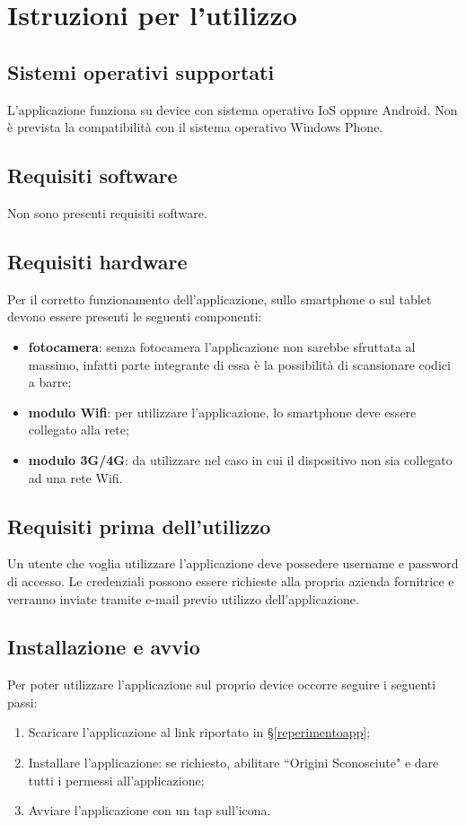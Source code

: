 \section{Istruzioni per l'utilizzo}

\subsection{Sistemi operativi supportati}

L'applicazione funziona su device con sistema operativo IoS oppure Android. Non è prevista la compatibilità con il sistema operativo Windows Phone.

\subsection{Requisiti software}

Non sono presenti requisiti software.

\subsection{Requisiti hardware}

Per il corretto funzionamento dell'applicazione, sullo smartphone o sul tablet devono essere presenti le seguenti componenti:
\begin{itemize}
	\item \textbf{fotocamera}: senza fotocamera l'applicazione non sarebbe sfruttata al massimo, infatti parte integrante di essa è la
	possibilità di scansionare codici a barre;
	\item \textbf{modulo Wifi}: per utilizzare l'applicazione, lo smartphone deve essere collegato alla rete;
	\item \textbf{modulo 3G/4G}: da utilizzare nel caso in cui il dispositivo non sia collegato ad una rete Wifi.
\end{itemize}

\subsection{Requisiti prima dell'utilizzo}

Un utente che voglia utilizzare l'applicazione deve possedere username e password di accesso. Le credenziali possono essere richieste alla propria azienda fornitrice e verranno inviate tramite e-mail previo utilizzo dell'applicazione.

\subsection{Installazione e avvio}

Per poter utilizzare l'applicazione sul proprio device occorre seguire i seguenti passi:
\begin{enumerate}
	\item Scaricare l'applicazione al link riportato in §\ref{reperimentoapp};
	\item Installare l'applicazione: se richiesto, abilitare ``Origini Sconosciute" e dare tutti i permessi all'applicazione;
	\item Avviare l'applicazione con un tap sull'icona.
\end{enumerate}